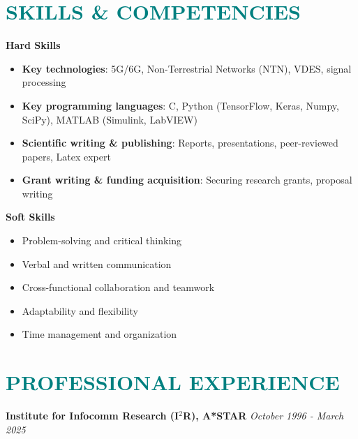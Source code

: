 \documentclass[a4paper, 11pt]{article}
\begin{document}
	
\section{\textcolor{teal}{\bf{SKILLS \& COMPETENCIES}}}

	\vspace{3pt}
	
	{\bf Hard Skills}
	\begin{itemize}[leftmargin=*, itemsep=-1mm]
		
		\item {\bf Key technologies}: 5G/6G, Non-Terrestrial Networks (NTN), VDES, signal processing
		
		\item {\bf Key programming languages}: C, Python (TensorFlow, Keras, Numpy, SciPy), MATLAB (Simulink, LabVIEW)
		
		\item {\bf Scientific writing \& publishing}: Reports, presentations, peer-reviewed papers, Latex expert
		
		\item {\bf Grant writing \& funding acquisition}: Securing research grants, proposal writing
		
	\end{itemize}
	{\bf Soft Skills}
	
	\begin{itemize}[leftmargin=*, itemsep=-1mm]
		
		\item Problem-solving and critical thinking
		
		\item Verbal and written communication
		
		\item Cross-functional collaboration and teamwork
		
		\item Adaptability and flexibility
		
		\item Time management and organization
		
	\end{itemize}
	

\section{\textcolor{teal}{\bf{PROFESSIONAL EXPERIENCE}}}

	\vspace{3pt}
		
	{\large \bf Institute for Infocomm Research (I$^{2}$R), A*STAR} \hfill {\large \it October 1996 - March 2025} 
		
\end{document}
